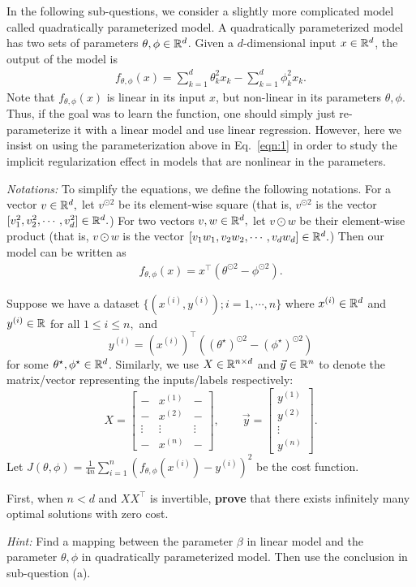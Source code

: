\item{}
In the following sub-questions, we consider a slightly more complicated model called quadratically parameterized model. A quadratically parameterized model has two sets of parameters $\theta,\phi\in \mathbb{R}^{d}$. Given a $d$-dimensional input $x\in \mathbb{R}^{d}$, the output of the model is 
\begin{align}
	f_{\theta,\phi}(x)=\sum_{k=1}^{d}\theta_k^2 x_k - \sum_{k=1}^{d}\phi_k^2 x_k.\label{eqn:1}
\end{align}
Note that $f_{\theta,\phi}(x)$ is linear in its input $x$, but non-linear in its parameters $\theta,\phi.$ Thus, if the goal was to learn the function, one should simply just re-parameterize it with a linear model and use linear regression. However, here we insist on using the parameterization above in Eq.~\eqref{eqn:1} in order to study the implicit regularization effect in models that are nonlinear in the parameters.

\emph{Notations:} To simplify the equations, we define the following notations. For a vector $v\in \mathbb{R}^{d},$ let $v^{\odot 2}$ be its element-wise square (that is, $v^{\odot 2}$ is the vector $[v_1^2, v_2^2,\cdots, v_d^2]\in \mathbb{R}^{d}.$)  For two vectors $v,w\in \mathbb{R}^{d},$ let $v\odot w$ be their element-wise product (that is, $v\odot w$ is the vector $[v_1w_1,v_2w_2,\cdots,v_dw_d]\in \mathbb{R}^{d}.$) Then our model can be written as 
\begin{align}
	f_{\theta,\phi}(x)=x^\top (\theta^{\odot 2} -\phi^{\odot 2}).
\end{align}

Suppose we have a dataset $\{(x^{(i)}, y^{(i)});i=1,\cdots,n\}$ where $x^{(i)}\in \mathbb{R}^{d}$ and $y^{(i)}\in \mathbb{R}$ for all $1\le i\le n,$ and $$y^{(i)}=(x^{(i)})^\top ((\theta^\star)^{\odot 2}- (\phi^\star)^{\odot 2})$$ for some $\theta^\star, \phi^\star\in \mathbb{R}^{d}$.
Similarly, we use $X\in \mathbb{R}^{n\times d}$ and $\vec{y}\in \mathbb{R}^{n}$ to denote the matrix/vector representing the inputs/labels respectively:
$$
X=
\begin{bmatrix}
	- & x^{(1)} & - \\
	- & x^{(2)} & - \\
	\vdots & \vdots & \vdots\\
	- & x^{(n)} & - 
\end{bmatrix},\qquad
\vec{y}=
\begin{bmatrix}
	y^{(1)} \\
	y^{(2)}\\
	\vdots\\
	y^{(n)}
\end{bmatrix}.
$$
Let $J(\theta,\phi)=\frac{1}{4n}\sum_{i=1}^{n}(f_{\theta,\phi}(x^{(i)})-y^{(i)})^2$ be the cost function.

First, when $n<d$ and $XX^\top$ is invertible, \textbf{prove} that there exists infinitely many optimal solutions with zero cost.

\emph{Hint:} Find a mapping between the parameter $\beta$ in linear model and the parameter $\theta,\phi$ in quadratically parameterized model. Then use the conclusion in sub-question (a).